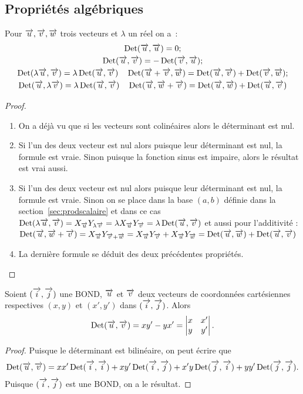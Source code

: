 \subsection{Propriétés algébriques}
\begin{prop}
Pour \(\vu, \vv, \vw\) trois vecteurs et \(\lambda\) un réel on a~:
\begin{gather}
  \Det(\vu,\vu)=0;\\
  \Det(\vu, \vv)=-\Det(\vv, \vu);\\
  \Det( \lambda \vu, \vv) = \lambda \Det(\vu, \vv) \quad \Det(\vu+ \vv, \vw) =\Det(\vu, \vv) + \Det(\vv, \vw);\\
  \Det(\vu, \lambda \vv) = \lambda \Det(\vu, \vv) \quad \Det(\vu, \vw + \vv) =\Det(\vu, \vw) + \Det(\vu, \vv)
\end{gather}
\end{prop}
\begin{proof}
\begin{enumerate}
\item On a déjà vu que si les vecteurs sont colinéaires alors le déterminant est nul.
\item Si l'un des deux vecteur est nul alors puisque leur déterminant est nul, la formule est vraie. Sinon puisque la fonction sinus est impaire, alors le résultat est vrai aussi.
\item Si l'un des deux vecteur est nul alors puisque leur déterminant est nul, la formule est vraie. Sinon on se place dans la base \((a,b)\) définie dans la section~\ref{sec:prodscalaire} et dans ce cas \(\Det( \lambda \vu, \vv) = X_{\vu} Y_{\lambda \vv}=\lambda X_{\vu} Y_{\vv}=\lambda \Det(\vu, \vv)\) et aussi pour l'additivité : \(\Det(\vu, \vw + \vv)=X_{\vu} Y_{\vv + \vw}= X_{\vu} Y_{\vv} + X_{\vu} Y_{\vw}=\Det(\vu, \vw) + \Det(\vu, \vv)\)
\item La dernière formule se déduit des deux précédentes propriétés.
\end{enumerate}
\end{proof}
\begin{prop}
Soient \((\vi,\vj)\) une BOND, \(\vu\) et \(\vv\) deux vecteurs de coordonnées cartésiennes respectives \((x,y)\) et \((x',y')\) dans \((\vi,\vj)\). Alors 
\begin{equation}
  \Det(\vu,\vv)=xy'-yx'=\begin{vmatrix} x&x'\\y&y'\end{vmatrix}.
\end{equation}
\end{prop}
\begin{proof}
  Puisque le déterminant est bilinéaire, on peut écrire que
  \begin{equation}
    \Det(\vu,\vv)=xx' \Det(\vi,\vi) + xy' \Det(\vi,\vj)+x'y\Det(\vj,\vi)+yy'\Det(\vj,\vj).
  \end{equation}
  Puisque \((\vi,\vj)\) est une BOND, on a le résultat.
\end{proof}

